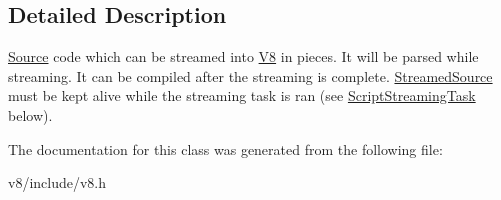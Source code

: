 \subsection{Detailed Description}
\hyperlink{classv8_1_1ScriptCompiler_1_1Source}{Source} code which can be streamed into \hyperlink{classv8_1_1V8}{V8} in pieces. It will be parsed while streaming. It can be compiled after the streaming is complete. \hyperlink{classv8_1_1ScriptCompiler_1_1StreamedSource}{Streamed\+Source} must be kept alive while the streaming task is ran (see \hyperlink{classv8_1_1ScriptCompiler_1_1ScriptStreamingTask}{Script\+Streaming\+Task} below). 

The documentation for this class was generated from the following file\+:\begin{DoxyCompactItemize}
\item 
v8/include/v8.\+h\end{DoxyCompactItemize}
